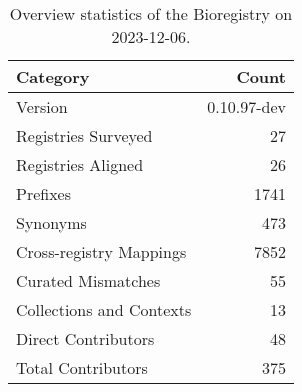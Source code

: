 \begin{table}
\caption{Overview statistics of the Bioregistry on 2023-12-06.}
\label{tab:bioregistry-summary}
\begin{tabular}{lr}
\toprule
Category & Count \\
\midrule
Version & 0.10.97-dev \\
Registries Surveyed & 27 \\
Registries Aligned & 26 \\
Prefixes & 1741 \\
Synonyms & 473 \\
Cross-registry Mappings & 7852 \\
Curated Mismatches & 55 \\
Collections and Contexts & 13 \\
Direct Contributors & 48 \\
Total Contributors & 375 \\
\bottomrule
\end{tabular}
\end{table}
